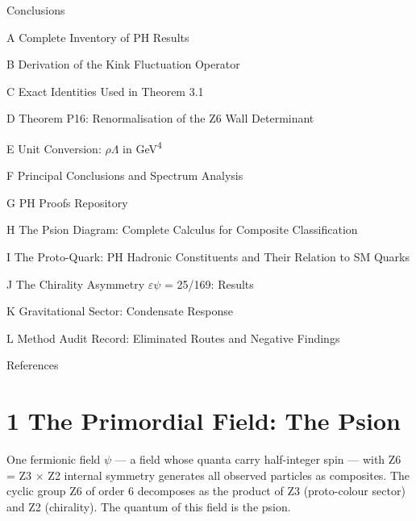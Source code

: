 \documentclass[11pt,letterpaper]{article}
\begin{document}
{\small {}  Conclusions\par}

{\small \noindent A  Complete Inventory of PH Results\par}

{\small \noindent B  Derivation of the Kink Fluctuation Operator\par}

{\small \noindent C  Exact Identities Used in Theorem 3.1\par}

{\small \noindent D  Theorem P16: Renormalisation of the Z6 Wall Determinant\par}

{\small \noindent E  Unit Conversion: $\rho$$\Lambda$ in GeV\textsuperscript{4}\par}

{\small \noindent F  Principal Conclusions and Spectrum Analysis\par}

{\small \noindent G  PH Proofs Repository\par}

{\small \noindent H  The Psion Diagram: Complete Calculus for Composite Classification\par}

{\small \noindent I  The Proto-Quark: PH Hadronic Constituents and Their Relation to SM Quarks\par}

{\small \noindent J  The Chirality Asymmetry $\varepsilon$$\psi$ = 25/169: Results\par}

{\small \noindent K  Gravitational Sector: Condensate Response\par}

{\small \noindent L  Method Audit Record: Eliminated Routes and Negative Findings\par}

{\small \noindent References\par}

\clearpage
\section*{1  The Primordial Field: The Psion}

\noindent One fermionic field $\psi$ --- a field whose quanta carry half-integer spin --- with Z6 = Z3 $\times$ Z2 internal symmetry generates all observed particles as composites. The cyclic group Z6 of order 6 decomposes as the product of Z3 (proto-colour sector) and Z2 (chirality). The quantum of this field is the psion.
\end{document}
